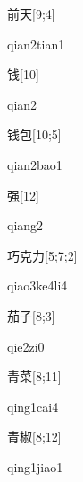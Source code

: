 \begin{verbete}{前天}[9;4]
\begin{pronuncia}{qian2tian1}
\end{pronuncia}
\end{verbete}

\begin{verbete}[qian2]{钱}[10]
\begin{pronuncia}{qian2}
\end{pronuncia}
\end{verbete}

\begin{verbete}{钱包}[10;5]
\begin{pronuncia}{qian2bao1}
\end{pronuncia}
\end{verbete}

\begin{verbete}[qiang2]{强}[12]
\begin{pronuncia}{qiang2}
\end{pronuncia}
\end{verbete}

\begin{verbete}[qiao3ke4li4]{巧克力}[5;7;2]
\begin{pronuncia}{qiao3ke4li4}
\end{pronuncia}
\end{verbete}

\begin{verbete}[qie2zi0]{茄子}[8;3]
\begin{pronuncia}{qie2zi0}
\end{pronuncia}
\end{verbete}

\begin{verbete}{青菜}[8;11]
\begin{pronuncia}{qing1cai4}
\end{pronuncia}
\end{verbete}

\begin{verbete}{青椒}[8;12]
\begin{pronuncia}{qing1jiao1}
\end{pronuncia}
\end{verbete}


